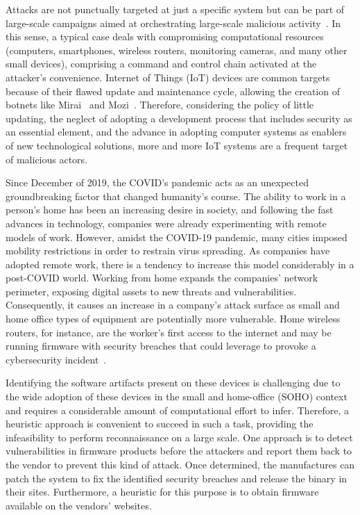 Attacks are not punctually targeted at just a specific system but can be part of large-scale campaigns aimed at orchestrating large-scale malicious activity~\cite{iotbotnet}. In this sense, a typical case deals with compromising computational resources (computers, smartphones, wireless routers, monitoring cameras, and many other small devices), comprising a command and control chain activated at the attacker's convenience. Internet of Things (IoT) devices are common targets because of their flawed update and maintenance cycle, allowing the creation of botnets like Mirai~\cite{mirai} and Mozi~\cite{mozi}. Therefore, considering the policy of little updating, the neglect of adopting a development process that includes security as an essential element, and the advance in adopting computer systems as enablers of new technological solutions, more and more IoT systems are a frequent target of malicious actors.

Since December of 2019, the COVID's pandemic acts as an unexpected groundbreaking factor that changed humanity's course.  The ability to work in a person's home has been an increasing desire in society, and following the fast advances in technology, companies were already experimenting with remote models of work. However, amidst the COVID-19 pandemic, many cities imposed mobility restrictions in order to restrain virus spreading.  As companies have adopted remote work, there is a tendency to increase this model considerably in a post-COVID world.  Working from home expands the companies' network perimeter, exposing digital assets to new threats and vulnerabilities. Consequently, it causes an increase in a company's attack surface as small and home office types of equipment are potentially more vulnerable. Home wireless routers, for instance, are the worker's first access to the internet and may be running firmware with security breaches that could leverage to provoke a cybersecurity incident~\cite{soho}.

Identifying the software artifacts present on these devices is challenging due to the wide adoption of these devices in the small and home-office (SOHO) context and requires a considerable amount of computational effort to infer. Therefore, a heuristic approach is convenient to succeed in such a task, providing the infeasibility to perform reconnaissance on a large scale. One approach is to detect vulnerabilities in firmware products before the attackers and report them back to the vendor to prevent this kind of attack. Once determined, the manufactures can patch the system to fix the identified security breaches and release the binary in their sites.  Furthermore, a heuristic for this purpose is to obtain firmware available on the vendors' websites.  


